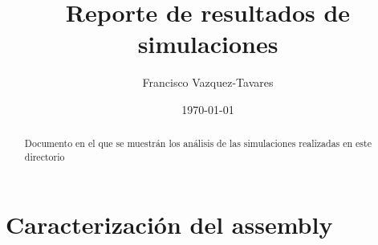 \documentclass[a4paper]{tufte-handout} %
\title{ Reporte de resultados de simulaciones }
\author{Francisco Vazquez-Tavares}
\date{\today} %
\begin{document}
\maketitle %


\begin{abstract}
Documento en el que se muestrán los análisis de las simulaciones realizadas en este directorio
\end{abstract}


%


%

\section{Caracterización del assembly}


\end{document}
